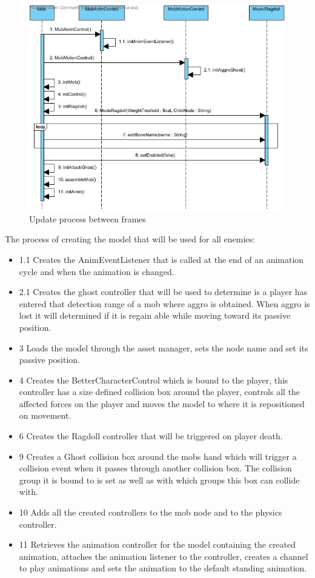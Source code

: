 \documentclass[letterpaper]{article}
\begin{document}
					\begin{figure}[H]
					\centering
					\includegraphics[width=160mm, height=90mm]{UML_Diagram/Sequence/Mob_Creation.jpg}
					\caption{Update process between frames}
					\label{overflow}
					\end{figure}
					
					The process of creating the model that will be used for all enemies:
					\begin{itemize}
						\item 1.1 Creates the AnimEventListener that is called at the end of an animation cycle and when the animation is changed.
						\item 2.1 Creates the ghost controller that will be used to determine is a player has entered that detection range of a mob where aggro is obtained. When aggro is lost it will determined if it is regain able while moving toward its passive position.
						\item 3 Loads the model through the asset manager, sets the node name and set its passive position.
						\item 4 Creates the BetterCharacterControl which is bound to the player, this controller has a size defined collision box around the player, controls all the affected forces on the player and moves the model to where it is repositioned on movement.
						\item 6 Creates the Ragdoll controller that will be triggered on player death.
						\item 9 Creates a Ghost collision box around the mobs hand which will trigger a collision event when it passes through another collision box. The collision group it is bound to is set as well as with which groups this box can collide with.
						\item 10 Adds all the created controllers to the mob node and to the physics controller.
						\item 11 Retrieves the animation controller for the model containing the created animation, attaches the animation listener to the controller, creates a channel to play animations and sets the animation to the default standing animation.
					\end{itemize}
					
\end{document}
